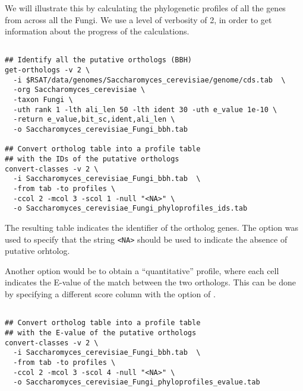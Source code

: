 We will illustrate this by calculating the phylogenetic profiles of
all the genes from  across all the
Fungi. We use a level of verbosity of 2, in order to get information
about the progress of the calculations.

\begin{small}
\begin{verbatim}

## Identify all the putative orthologs (BBH)
get-orthologs -v 2 \
  -i $RSAT/data/genomes/Saccharomyces_cerevisiae/genome/cds.tab  \
  -org Saccharomyces_cerevisiae \
  -taxon Fungi \
  -uth rank 1 -lth ali_len 50 -lth ident 30 -uth e_value 1e-10 \
  -return e_value,bit_sc,ident,ali_len \
  -o Saccharomyces_cerevisiae_Fungi_bbh.tab

## Convert ortholog table into a profile table
## with the IDs of the putative orthologs
convert-classes -v 2 \
  -i Saccharomyces_cerevisiae_Fungi_bbh.tab  \
  -from tab -to profiles \
  -ccol 2 -mcol 3 -scol 1 -null "<NA>" \
  -o Saccharomyces_cerevisiae_Fungi_phyloprofiles_ids.tab

\end{verbatim}
\end{small}


The resulting table indicates the identifier of the ortholog
genes. The option \option{-null} was used to specify that the string
\texttt{<NA>} should be used to indicate the absence of putative
orhtolog.

Another option would be to obtain a ``quantitative'' profile, where
each cell indicates the E-value of the match between the two
orthologs. This can be done by specifying a different score column
with the option  of .

\begin{small}
\begin{verbatim}

## Convert ortholog table into a profile table
## with the E-value of the putative orthologs
convert-classes -v 2 \
  -i Saccharomyces_cerevisiae_Fungi_bbh.tab  \
  -from tab -to profiles \
  -ccol 2 -mcol 3 -scol 4 -null "<NA>" \
  -o Saccharomyces_cerevisiae_Fungi_phyloprofiles_evalue.tab

\end{verbatim}
\end{small}

